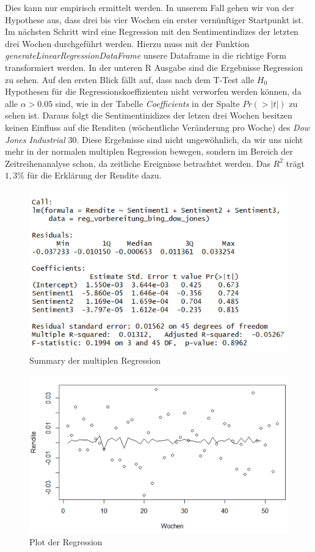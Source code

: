 Dies kann nur empirisch ermittelt werden. In unserem Fall gehen wir von der Hypothese aus, dass drei bis vier Wochen ein erster vernünftiger Startpunkt ist. Im nächsten Schritt wird eine Regression mit den Sentimentindizes der letzten drei Wochen durchgeführt werden. Hierzu muss mit der Funktion \textit{generateLinearRegressionDataFrame} unsere Dataframe in die richtige Form transformiert werden. In der unteren R Ausgabe sind die Ergebnisse Regression zu sehen. Auf den ersten Blick fällt auf, dass nach dem T-Test alle $H_{0}$ Hypothesen für die Regressionskoeffizienten nicht verworfen werden können, da alle $\alpha>0.05$ sind, wie in der Tabelle \textit{Coefficients} in der Spalte $Pr(>|t|)$ zu sehen ist. Daraus folgt die Sentimentinidizes der letzen drei Wochen besitzen keinen Einfluss auf die Renditen (wöchentliche Veränderung pro Woche)  des \textit{Dow Jones Industrial} $30$. Diese Ergebnisse sind nicht ungewöhnlich, da wir uns nicht mehr in der normalen multiplen Regression bewegen, sondern im Bereich der Zeitreihenanalyse schon, da zeitliche Ereignisse betrachtet werden. Das $R^2$ trägt $1,3\%$ für die Erklärung der Rendite dazu. 
 \begin{figure}[H]
   	\centering
  \includegraphics[width=1\textwidth]{Pictures/ergebnisse_sentiment.png}
   	\caption{Summary der multiplen Regression}
\end{figure}
 \begin{figure}[H]
	\centering
	\includegraphics[width=1\textwidth]{Pictures/Regression_bing_diff.png}
	\caption{Plot der Regression}
\end{figure}
